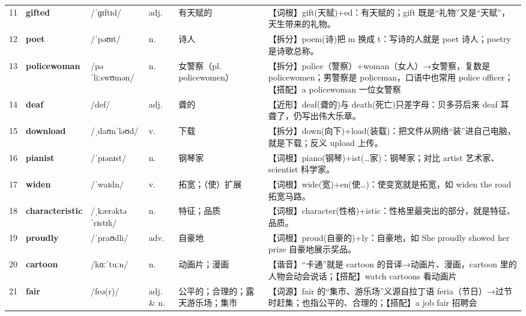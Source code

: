 \documentclass[UTF8,a4paper,11pt,oneside]{ctexbook}
\newcommand{\cellword}[1]{{\bfseries\textcolor{wordcol}{#1}}}
\newcommand{\cellipa}[1]{{\footnotesize\textcolor{ipacol}{#1}}}
\newcommand{\cellpos}[1]{\textcolor{poscol}{#1}}
\newcommand{\cellno}[1]{\textcolor{volcolor!75!black}{#1}}
\begin{document}
{\begin{longtable}{@{}C{0.045\textwidth}L{0.155\textwidth}L{0.175\textwidth}C{0.070\textwidth}L{0.180\textwidth}L{0.282\textwidth}@{}}
 \cellno{11} & \cellword{gifted} & \cellipa{/ˈɡɪftɪd/} & \cellpos{adj.} & 有天赋的 & \textcolor{tagRoot}{【词根】}gift(天赋)+ed：有天赋的；gift 既是“礼物”又是“天赋”，天生带来的礼物。 \\
\cellno{12} & \cellword{poet} & \cellipa{/ˈpəʊɪt/} & \cellpos{n.} & 诗人 & \textcolor{tagSplit}{【拆分】}poem(诗)把 m 换成 t：写诗的人就是 poet 诗人；poetry 是诗歌总称。 \\
 \cellno{13} & \cellword{policewoman} & \cellipa{/pəˈliːswʊmən/} & \cellpos{n.} & 女警察（pl. policewomen） & \textcolor{tagSplit}{【拆分】}police（警察）+woman（女人）→\allowbreak{}女警察，复数是 policewomen；男警察是 policeman，口语中也常用 police officer；\textcolor{tagColloc}{【搭配】}a policewoman 一位女警察 \\
\cellno{14} & \cellword{deaf} & \cellipa{/def/} & \cellpos{adj.} & 聋的 & \textcolor{tagNear}{【近形】}deaf(聋的)与 death(死亡)只差字母：贝多芬后来 deaf 耳聋了，仍写出伟大乐章。 \\
 \cellno{15} & \cellword{download} & \cellipa{/ˌdaʊnˈləʊd/} & \cellpos{v.} & 下载 & \textcolor{tagSplit}{【拆分】}down(向下)+load(装载)：把文件从网络“装”进自己电脑，就是下载；反义 upload 上传。 \\
\cellno{16} & \cellword{pianist} & \cellipa{/ˈpɪənɪst/} & \cellpos{n.} & 钢琴家 & \textcolor{tagRoot}{【词根】}piano(钢琴)+ist(…家)：钢琴家；对比 artist 艺术家、scientist 科学家。 \\
 \cellno{17} & \cellword{widen} & \cellipa{/ˈwaɪdn/} & \cellpos{v.} & 拓宽；（使）扩展 & \textcolor{tagRoot}{【词根】}wide(宽)+en(使…)：使变宽就是拓宽，如 widen the road 拓宽马路。 \\
\cellno{18} & \cellword{characteristic} & \cellipa{/ˌkærəktəˈrɪstɪk/} & \cellpos{n.} & 特征；品质 & \textcolor{tagRoot}{【词根】}character(性格)+istic：性格里最突出的部分，就是特征、品质。 \\
 \cellno{19} & \cellword{proudly} & \cellipa{/ˈpraʊdli/} & \cellpos{adv.} & 自豪地 & \textcolor{tagRoot}{【词根】}proud(自豪的)+ly：自豪地，如 She proudly showed her prize 自豪地展示奖品。 \\
\cellno{20} & \cellword{cartoon} & \cellipa{/kɑːˈtuːn/} & \cellpos{n.} & 动画片；漫画 & \textcolor{tagSound}{【谐音】}“卡通”就是 cartoon 的音译→\allowbreak{}动画片、漫画，cartoon 里的人物会动会说话；\textcolor{tagColloc}{【搭配】}watch cartoons 看动画片 \\
 \cellno{21} & \cellword{fair} & \cellipa{/feə(r)/} & \cellpos{adj.  \& n.} & 公平的；合理的；露天游乐场；集市 & \textcolor{tagEtym}{【词源】}fair 的“集市、游乐场”义源自拉丁语 feria（节日）→\allowbreak{}过节时赶集；也指公平的、合理的；\textcolor{tagColloc}{【搭配】}a job fair 招聘会 \\

\end{longtable}}
\end{document}
